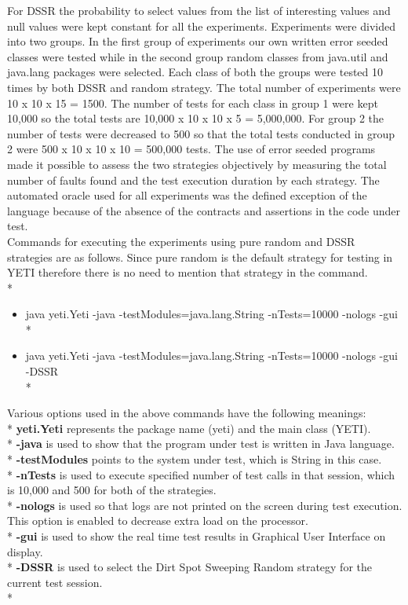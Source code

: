 \documentclass[10pt, conference, compsocconf]{IEEEtran}
\begin{document}
For DSSR the probability to select values from the list of interesting values and null values were kept constant for all the experiments. Experiments were divided into two groups. In the first group of experiments our own written error seeded classes were tested while in the second group random classes from java.util and java.lang packages were selected. Each class of both the groups were tested 10 times by both DSSR and random strategy. The total number of experiments were 10 x 10 x 15 = 1500. The number of tests for each class in group 1 were kept 10,000 so the total tests are 10,000 x 10 x 10 x 5 = 5,000,000.  For group 2 the number of tests were decreased to 500 so that the total tests conducted in group 2 were 500 x 10 x 10 x 10 = 500,000 tests. The use of error seeded programs made it possible to assess the two strategies objectively by measuring the total number of faults found and the test execution duration by each strategy. The automated oracle used for all experiments was the defined exception of the language because of the absence of the contracts and assertions in the code under test.\\

Commands for executing the experiments using pure random and DSSR strategies are as follows. Since pure random is the default strategy for testing in YETI therefore there is no need to mention that strategy in the command.\\*

\begin{itemize}

\item java yeti.Yeti -java -testModules=java.lang.String -nTests=10000 -nologs -gui\\*

\item java yeti.Yeti -java -testModules=java.lang.String -nTests=10000 -nologs -gui -DSSR\\*

\end{itemize}

Various options used in the above commands have the following meanings:\\*
\textbf{yeti.Yeti} represents the package name (yeti) and the main class (YETI).\\*
\textbf{-java} is used to show that the program under test is written in Java language.\\*
\textbf{-testModules} points to the system under test, which is String in this case.\\*
\textbf{-nTests} is used to execute specified number of test calls in that session, which is 10,000 and 500 for both of the strategies.\\*
\textbf{-nologs} is used so that logs are not printed on the screen during test execution. This option is enabled to decrease extra load on the processor.\\*
\textbf{-gui} is used to show the real time test results in Graphical User Interface on display.\\*
\textbf{-DSSR} is used to select the Dirt Spot Sweeping Random strategy for the current test session.\\*
\end{document}
